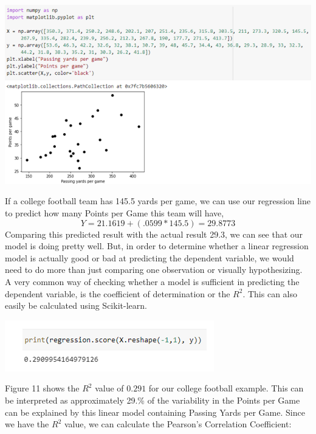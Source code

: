 \documentclass[a4paper,12pt]{report}
\begin{document}
\begin{center}
    \captionsetup{type=figure}
    \includegraphics[width=.9\linewidth]{media/scatterplotmatplot.png}
\end{center}

If a college football team has 145.5 yards per game, we can use our regression line to predict how many Points per Game this team will have, 
$$Y=21.1619+(.0599*145.5)=29.8773$$
Comparing this predicted result with the actual result 29.3, we can see that our model is doing pretty well. But, in order to determine whether a linear regression model is actually good or bad at predicting the dependent variable, we would need to do more than just comparing one observation or visually hypothesizing. A very common way of checking whether a model is sufficient in predicting the dependent variable, is the coefficient of determination or the $R^2$. This can also easily be calculated using Scikit-learn. 

\begin{center}
    \captionsetup{type=figure}
    \includegraphics[width=.9\linewidth]{media/printregression.png}
\end{center}

Figure 11 shows the $R^2$ value of $0.291$ for our college football example. This can be interpreted as approximately 29.\% of the variability in the Points per Game can be explained by this linear model containing Passing Yards per Game. Since we have the $R^2$ value, we can calculate the Pearson’s Correlation Coefficient:
\end{document}
